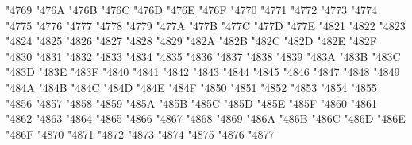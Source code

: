 {\Uchar\jis"4769 %
\Uchar\jis"476A %
\Uchar\jis"476B %
\Uchar\jis"476C %
\Uchar\jis"476D %
\Uchar\jis"476E %
\Uchar\jis"476F %
\Uchar\jis"4770 %
\Uchar\jis"4771 %
\Uchar\jis"4772 %
\Uchar\jis"4773 %
\Uchar\jis"4774 %
\Uchar\jis"4775 %
\Uchar\jis"4776 %
\Uchar\jis"4777 %
\Uchar\jis"4778 %
\Uchar\jis"4779 %
\Uchar\jis"477A %
\Uchar\jis"477B %
\Uchar\jis"477C %
\Uchar\jis"477D %
\Uchar\jis"477E %
\Uchar\jis"4821 %
\Uchar\jis"4822 %
\Uchar\jis"4823 %
\Uchar\jis"4824 %
\Uchar\jis"4825 %
\Uchar\jis"4826 %
\Uchar\jis"4827 %
\Uchar\jis"4828 %
\Uchar\jis"4829 %
\Uchar\jis"482A %
\Uchar\jis"482B %
\Uchar\jis"482C %
\Uchar\jis"482D %
\Uchar\jis"482E %
\Uchar\jis"482F %
\Uchar\jis"4830 %
\Uchar\jis"4831 %
\Uchar\jis"4832 %
\Uchar\jis"4833 %
\Uchar\jis"4834 %
\Uchar\jis"4835 %
\Uchar\jis"4836 %
\Uchar\jis"4837 %
\Uchar\jis"4838 %
\Uchar\jis"4839 %
\Uchar\jis"483A %
\Uchar\jis"483B %
\Uchar\jis"483C %
\Uchar\jis"483D %
\Uchar\jis"483E %
\Uchar\jis"483F %
\Uchar\jis"4840 %
\Uchar\jis"4841 %
\Uchar\jis"4842 %
\Uchar\jis"4843 %
\Uchar\jis"4844 %
\Uchar\jis"4845 %
\Uchar\jis"4846 %
\Uchar\jis"4847 %
\Uchar\jis"4848 %
\Uchar\jis"4849 %
\Uchar\jis"484A %
\Uchar\jis"484B %
\Uchar\jis"484C %
\Uchar\jis"484D %
\Uchar\jis"484E %
\Uchar\jis"484F %
\Uchar\jis"4850 %
\Uchar\jis"4851 %
\Uchar\jis"4852 %
\Uchar\jis"4853 %
\Uchar\jis"4854 %
\Uchar\jis"4855 %
\Uchar\jis"4856 %
\Uchar\jis"4857 %
\Uchar\jis"4858 %
\Uchar\jis"4859 %
\Uchar\jis"485A %
\Uchar\jis"485B %
\Uchar\jis"485C %
\Uchar\jis"485D %
\Uchar\jis"485E %
\Uchar\jis"485F %
\Uchar\jis"4860 %
\Uchar\jis"4861 %
\Uchar\jis"4862 %
\Uchar\jis"4863 %
\Uchar\jis"4864 %
\Uchar\jis"4865 %
\Uchar\jis"4866 %
\Uchar\jis"4867 %
\Uchar\jis"4868 %
\Uchar\jis"4869 %
\Uchar\jis"486A %
\Uchar\jis"486B %
\Uchar\jis"486C %
\Uchar\jis"486D %
\Uchar\jis"486E %
\Uchar\jis"486F %
\Uchar\jis"4870 %
\Uchar\jis"4871 %
\Uchar\jis"4872 %
\Uchar\jis"4873 %
\Uchar\jis"4874 %
\Uchar\jis"4875 %
\Uchar\jis"4876 %
\Uchar\jis"4877 %
}
